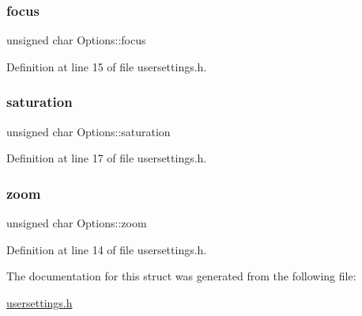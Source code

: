 \subsubsection{\texorpdfstring{focus}{focus}}
{\footnotesize\ttfamily unsigned char Options\+::focus}



Definition at line 15 of file usersettings.\+h.

\mbox{\label{structOptions_a789c6ab9b7f014b3cae84efbf1646e83}} 
\subsubsection{\texorpdfstring{saturation}{saturation}}
{\footnotesize\ttfamily unsigned char Options\+::saturation}



Definition at line 17 of file usersettings.\+h.

\mbox{\label{structOptions_adfa04ac8009b74b40fc38595bc9a2dd0}} 
\subsubsection{\texorpdfstring{zoom}{zoom}}
{\footnotesize\ttfamily unsigned char Options\+::zoom}



Definition at line 14 of file usersettings.\+h.



The documentation for this struct was generated from the following file\+:\begin{DoxyCompactItemize}
\item 
\mbox{\hyperlink{usersettings_8h}{usersettings.\+h}}\end{DoxyCompactItemize}
